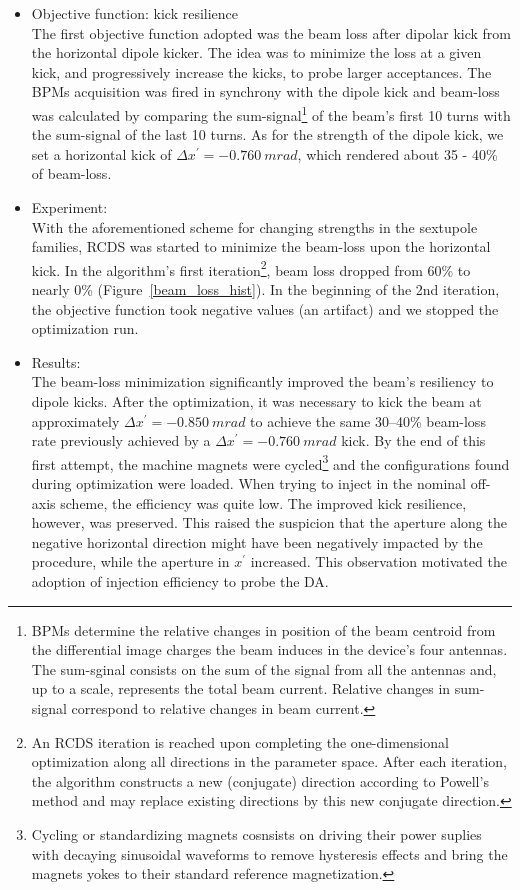     \begin{itemize}
        \item Objective function: kick resilience\\
        The first objective function adopted was the beam loss after dipolar kick from the horizontal dipole kicker. The idea was to minimize the loss at a given kick, and progressively increase the kicks, to probe larger acceptances. The BPMs acquisition was fired in synchrony with the dipole kick and beam-loss was calculated by comparing the sum-signal\footnote{BPMs determine the relative changes in position of the beam centroid from the differential image charges the beam induces in the device's four antennas. The sum-sginal consists on the sum of the signal from all the antennas and, up to a scale, represents the total beam current. Relative changes in sum-signal correspond to relative changes in beam current. } of the beam's first 10 turns with the sum-signal of the last 10 turns. As for the strength of the dipole kick, we set a horizontal kick of $\Delta x^\prime = -0.760~ \unit{m rad}$, which rendered about 35 - 40\% of beam-loss.
        \item Experiment: \\
        With the aforementioned scheme for changing strengths in the sextupole families, RCDS was started to minimize the beam-loss upon the horizontal kick. In the algorithm's first iteration\footnote{An RCDS iteration is reached upon completing the one-dimensional optimization along all directions in the parameter space. After each iteration, the algorithm constructs a new (conjugate) direction according to Powell's method and may replace existing directions by this new conjugate direction.}, beam loss dropped from 60\% to nearly 0\% (Figure~\ref{beam_loss_hist}). In the beginning of the 2nd iteration, the objective function took negative values (an artifact) and we stopped the optimization run.
        \item Results:\\
         The beam-loss minimization significantly improved the beam's resiliency to dipole kicks. After the optimization, it was necessary to kick the beam at approximately $\Delta x^\prime=-0.850~\unit{m rad}$ to achieve the same  30--40\% beam-loss rate previously achieved by a $\Delta x^\prime=-0.760~\unit{m rad}$ kick. By the end of this first attempt, the machine magnets were cycled\footnote{Cycling or standardizing magnets cosnsists on driving their power suplies with decaying sinusoidal waveforms to remove hysteresis effects and bring the magnets yokes to their standard reference magnetization.} and the configurations found during optimization were loaded. When trying to inject in the nominal off-axis scheme, the efficiency was quite low. The improved kick resilience, however, was preserved. This raised the suspicion that the aperture along the negative horizontal direction might have been negatively impacted by the procedure, while the aperture in $x^\prime$ increased. This observation motivated the adoption of injection efficiency to probe the DA.
    \end{itemize}
